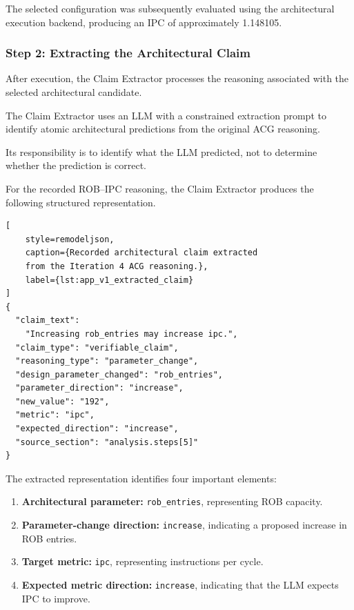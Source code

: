 The selected configuration was subsequently
evaluated using the architectural execution
backend, producing an IPC of approximately
1.148105.



\subsubsection{Step 2: Extracting the Architectural Claim}

After execution, the Claim Extractor processes
the reasoning associated with the selected
architectural candidate.

The Claim Extractor uses an LLM with a
constrained extraction prompt to identify
atomic architectural predictions from
the original ACG reasoning.

Its responsibility is to identify what the
LLM predicted, not to determine whether
the prediction is correct.

For the recorded ROB--IPC reasoning, the
Claim Extractor produces the following
structured representation.

\begin{lstlisting}[
    style=remodeljson,
    caption={Recorded architectural claim extracted
    from the Iteration 4 ACG reasoning.},
    label={lst:app_v1_extracted_claim}
]
{
  "claim_text":
    "Increasing rob_entries may increase ipc.",
  "claim_type": "verifiable_claim",
  "reasoning_type": "parameter_change",
  "design_parameter_changed": "rob_entries",
  "parameter_direction": "increase",
  "new_value": "192",
  "metric": "ipc",
  "expected_direction": "increase",
  "source_section": "analysis.steps[5]"
}
\end{lstlisting}

The extracted representation identifies four
important elements:

\begin{enumerate}
    \item \textbf{Architectural parameter:}
    \texttt{rob\_entries}, representing ROB capacity.

    \item \textbf{Parameter-change direction:}
    \texttt{increase}, indicating a proposed
    increase in ROB entries.

    \item \textbf{Target metric:}
    \texttt{ipc}, representing instructions
    per cycle.

    \item \textbf{Expected metric direction:}
    \texttt{increase}, indicating that the
    LLM expects IPC to improve.
\end{enumerate}

